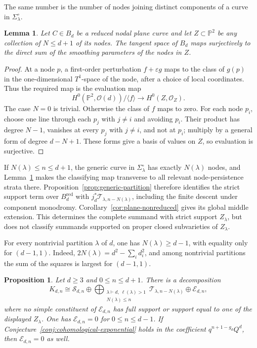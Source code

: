 \documentclass[11pt,reqno]{amsart}
\newtheorem{proposition}[theorem]{Proposition}
\newtheorem{lemma}[theorem]{Lemma}
\theoremstyle{definition}
\newcommand{\Pp}{\mathbb P}
\newcommand{\Ocal}{\mathcal O}
\newcommand{\red}{\mathrm{red}}
\begin{document}
The same number is the number of nodes joining distinct components of a curve
in $\Sigma_\lambda^\circ$.

\begin{lemma}\label{lem:plane-node-versality}
Let $C\in B_d$ be a reduced nodal plane curve and let
$Z\subset\Pp^2$ be any collection of $N\le d+1$ of its nodes.  The
tangent space of $B_d$ maps surjectively to the direct sum of the smoothing
parameters of the nodes in $Z$.
\end{lemma}

\begin{proof}
At a node $p$, a first-order perturbation $f+\varepsilon g$ maps to the
class of $g(p)$ in the one-dimensional $T^1$-space of the node, after a
choice of local coordinates.  Thus the required map is the evaluation map
\[
  H^0(\Pp^2,\Ocal(d))/\langle f\rangle
  \longrightarrow H^0(Z,\Ocal_Z).
\]
The case $N=0$ is trivial.  Otherwise the class of $f$ maps to zero.  For each
node $p_i$, choose one line through each $p_j$ with $j\ne i$ and avoiding
$p_i$.  Their product has degree
$N-1$, vanishes at every $p_j$ with $j\ne i$, and not at $p_i$; multiply by
a general form of degree $d-N+1$.  These forms give a basis of values on
$Z$, so evaluation is surjective.
\end{proof}

If $N(\lambda)\le n\le d+1$, the generic curve in
$\Sigma_\lambda^\circ$ has exactly $N(\lambda)$ nodes, and
Lemma~\ref{lem:plane-node-versality} makes the classifying map transverse
to all relevant node-persistence strata there.
Proposition~\ref{prop:generic-partition} therefore identifies the strict
support term over $B_d^{\red}$ with
$j_d^*\mathcal T_{\lambda,n-N(\lambda)}$, including the finite descent under
component monodromy.  Corollary~\ref{cor:plane-nonreduced} gives its global
middle extension.  This determines the complete summand with strict support
$Z_\lambda$, but does not classify summands supported on proper closed
subvarieties of $Z_\lambda$.

For every nontrivial partition $\lambda$ of $d$, one has
$N(\lambda)\ge d-1$, with equality only for $(d-1,1)$.  Indeed,
$2N(\lambda)=d^2-\sum_i d_i^2$, and among nontrivial partitions the sum of
the squares is largest for $(d-1,1)$.

\begin{proposition}\label{prop:plane-supports}
Let $d\ge3$ and $0\le n\le d+1$.  There is a decomposition
\[
  K_{d,n}
  \cong
  \mathcal S_{d,n}
  \oplus
  \bigoplus_{\substack{\lambda\vdash d,\ \ell(\lambda)>1\\
                        N(\lambda)\le n}}
  \mathcal T_{\lambda,n-N(\lambda)}
  \oplus\mathcal E_{d,n},
\]
where no simple constituent of $\mathcal E_{d,n}$ has full support or support
equal to one of the displayed $Z_\lambda$.  One has
$\mathcal E_{d,n}=0$ for $0\le n\le d-1$.  If
Conjecture~\ref{conj:cohomological-exponential} holds in the coefficient
$q^{n+1-g_d}Q^d$, then $\mathcal E_{d,n}=0$ as well.
\end{proposition}
\end{document}
